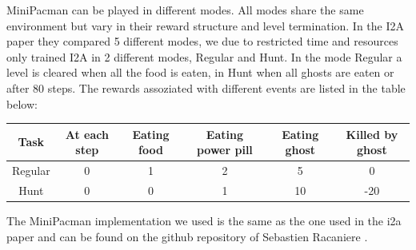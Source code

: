 MiniPacman can be played in different modes. All modes share the same environment but vary in their reward structure and level termination.
In the I2A paper they compared 5 different modes, we due to restricted time and resources only trained I2A in 2 different modes, Regular and Hunt. In the mode Regular a level is cleared when all the food is eaten, in Hunt when all ghosts are eaten or after 80 steps. 
The rewards assoziated with different events are listed in the table below:

\begin{center}
	\begin{tabular}{| c | c | c | c |c | c | }
	\hline
	Task 	& At each step 	& Eating food 
		& Eating power pill & Eating ghost  & Killed by ghost\\
	\hline
	Regular & 0		& 1 	& 2		& 5		& 0 \\
	Hunt	& 0		& 0		& 1		& 10	& -20\\
	\hline
	\end{tabular}
\end{center}

The MiniPacman implementation we used is the same as the one used in the i2a paper and can be found on the github repository of Sebastien Racaniere \cite{MiniPacmanRepo}.


